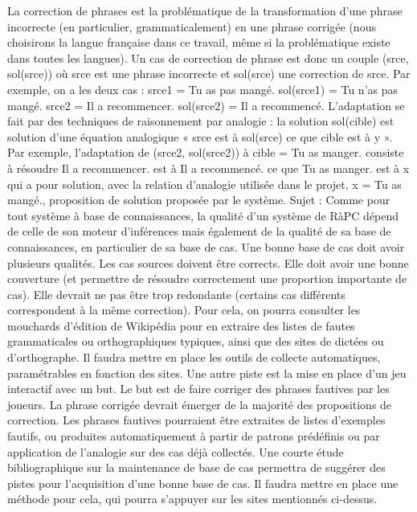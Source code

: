 \documentclass{article}
\begin{document}
La correction de phrases est la probl\'ematique de la transformation d'une phrase incorrecte (en particulier, grammaticalement) en une phrase corrig\'ee (nous choisirons la langue française dans ce travail, m\^eme si la probl\'ematique existe dans toutes les langues). Un cas de correction de phrase est donc un couple (srce, sol(srce)) o\`{u} srce est une phrase incorrecte et sol(srce) une correction de srce. Par exemple, on a les deux cas : 
srce1 = Tu as pas mang\'e. sol(srce1) = Tu n'as pas mang\'e. 
srce2 = Il a recommencer. sol(srce2) = Il a recommenc\'e. 
L'adaptation se fait par des techniques de raisonnement par analogie : la solution sol(cible) est solution d'une \'equation analogique « srce est \`{a} sol(srce) ce que cible est \`{a} y ». Par exemple, l'adaptation de (srce2, sol(srce2)) \`{a} cible = Tu as manger. consiste \`{a} r\'esoudre Il a recommencer. est \`{a} Il a recommenc\'e. ce que Tu as manger. est \`{a} x qui a pour solution, avec la relation d'analogie utilis\'ee dans le projet, x = Tu as mang\'e., proposition de solution propos\'ee par le syst\`{e}me. 
Sujet : 
Comme pour tout syst\`{e}me \`{a} base de connaissances, la qualit\'e d'un syst\`{e}me de R\`{a}PC d\'epend de celle de son moteur d'inf\'erences mais \'egalement de la qualit\'e de sa base de connaissances, en particulier de sa base de cas. Une bonne base de cas doit avoir plusieurs qualit\'es. Les cas sources doivent être corrects. Elle doit avoir une bonne couverture (et permettre de r\'esoudre correctement une proportion importante de cas). Elle devrait ne pas être trop redondante (certains cas diff\'erents correspondent \`{a} la même correction). 
Pour cela, on pourra consulter les mouchards d'\'edition de Wikip\'edia pour en extraire des listes de fautes grammaticales ou orthographiques typiques, ainsi que des sites de dict\'ees ou d'orthographe. Il faudra mettre en place les outils de collecte automatiques, param\'etrables en fonction des sites. 
Une autre piste est la mise en place d'un jeu interactif avec un but. Le but est de faire corriger des phrases fautives par les joueurs. La phrase corrig\'ee devrait \'emerger de la majorit\'e des propositions de correction. Les phrases fautives pourraient être extraites de listes d'exemples fautifs, ou produites automatiquement \`{a} partir de patrons pr\'ed\'efinis ou par application de l'analogie sur des cas d\'ej\`{a} collect\'es.
Une courte \'etude bibliographique sur la maintenance de base de cas permettra de sugg\'erer des pistes pour l'acquisition d'une bonne base de cas. Il faudra mettre en place une m\'ethode pour cela, qui pourra s'appuyer sur les sites mentionn\'es ci-dessus.



\end{document}
